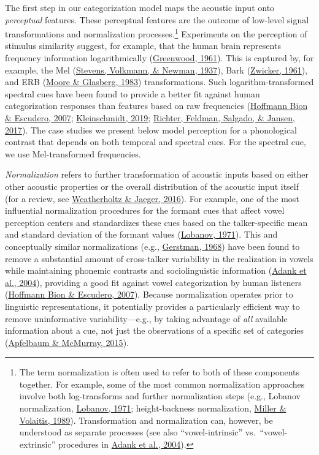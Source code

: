 \documentclass[
  11pt,
  english,
  man,floatsintext]{apa6}
\begin{document}
The first step in our categorization model maps the acoustic input onto \emph{perceptual} features. These perceptual features are the outcome of low-level signal transformations and normalization processes.\footnote{The term normalization is often used to refer to both of these components together. For example, some of the most common normalization approaches involve both log-transforms and further normalization steps (e.g., Lobanov normalization, \protect\hyperlink{ref-lobanov1971}{Lobanov, 1971}; height-backness normalization, \protect\hyperlink{ref-miller1989}{Miller \& Volaitis, 1989}). Transformation and normalization can, however, be understood as separate processes (see also {``vowel-intrinsic''} vs.~{``vowel-extrinsic''} procedures in \protect\hyperlink{ref-adank2004}{Adank et al., 2004}).} Experiments on the perception of stimulus similarity suggest, for example, that the human brain represents frequency information logarithmically (\protect\hyperlink{ref-greenwood1961}{Greenwood, 1961}). This is captured by, for example, the Mel (\protect\hyperlink{ref-stevens1937}{Stevens, Volkmann, \& Newman, 1937}), Bark (\protect\hyperlink{ref-zwicker1961}{Zwicker, 1961}), and ERB (\protect\hyperlink{ref-moore-glasberg1983}{Moore \& Glasberg, 1983}) transformations. Such logarithm-transformed spectral cues have been found to provide a better fit against human categorization responses than features based on raw frequencies (\protect\hyperlink{ref-hoffmanbion-escudero2007}{Hoffmann Bion \& Escudero, 2007}; \protect\hyperlink{ref-kleinschmidt2019}{Kleinschmidt, 2019}; \protect\hyperlink{ref-richter2017}{Richter, Feldman, Salgado, \& Jansen, 2017}). The case studies we present below model perception for a phonological contrast that depends on both temporal and spectral cues. For the spectral cue, we use Mel-transformed frequencies.

\emph{Normalization} refers to further transformation of acoustic inputs based on either other acoustic properties or the overall distribution of the acoustic input itself (for a review, see \protect\hyperlink{ref-weatherholtz-jaeger2016}{Weatherholtz \& Jaeger, 2016}). For example, one of the most influential normalization procedures for the formant cues that affect vowel perception centers and standardizes these cues based on the talker-specific mean and standard deviation of the formant values (\protect\hyperlink{ref-lobanov1971}{Lobanov, 1971}). This and conceptually similar normalizations (e.g., \protect\hyperlink{ref-gerstman1968}{Gerstman, 1968}) have been found to remove a substantial amount of cross-talker variability in the realization in vowels while maintaining phonemic contrasts and sociolinguistic information (\protect\hyperlink{ref-adank2004}{Adank et al., 2004}), providing a good fit against vowel categorization by human listeners (\protect\hyperlink{ref-hoffmanbion-escudero2007}{Hoffmann Bion \& Escudero, 2007}). Because normalization operates prior to linguistic representations, it potentially provides a particularly efficient way to remove uninformative variability---e.g., by taking advantage of \emph{all} available information about a cue, not just the observations of a specific set of categories (\protect\hyperlink{ref-apfelbaum-mcmurray2015}{Apfelbaum \& McMurray, 2015}).
\end{document}
